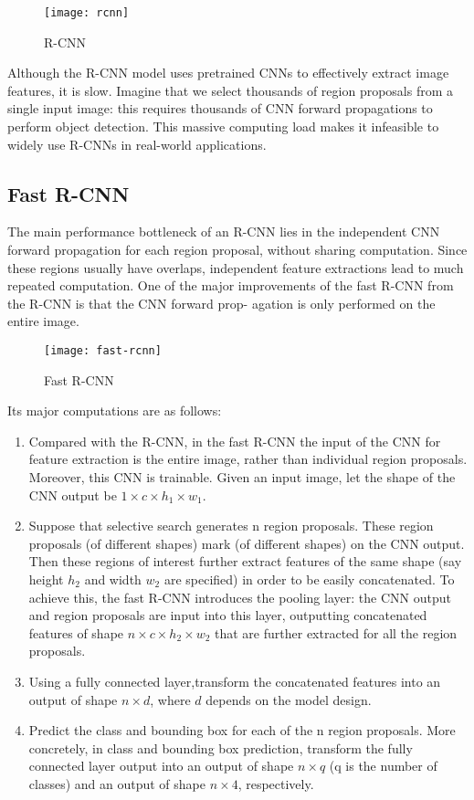 \begin{figure}[H]
  \centering
  \texttt{[image: rcnn]}
  \caption{R-CNN}
  \label{fig:r-cnn}
\end{figure}

Although the R-CNN model uses pretrained CNNs to effectively extract image features, it is slow.
Imagine that we select thousands of region proposals from a single input image: this requires thousands of CNN forward propagations to perform object detection.
This massive computing load makes it infeasible to widely use R-CNNs in real-world applications.


\subsection{Fast R-CNN}
\label{sec:fast-r-cnn}

The main performance bottleneck of an R-CNN lies in the independent CNN forward propagation for each region proposal, without sharing computation.
Since these regions usually have overlaps, independent feature extractions lead to much repeated computation.
One of the major improvements of the fast R-CNN from the R-CNN is that the CNN forward prop- agation is only performed on the entire image.

\begin{figure}[H]
  \centering
  \texttt{[image: fast-rcnn]}
  \caption{Fast R-CNN}
  \label{fig:fast-rcnn}
\end{figure}

Its major computations are as follows:
\begin{enumerate}
\item Compared with the R-CNN, in the fast R-CNN the input of the CNN for feature extraction is the entire image, rather than individual region proposals.
  Moreover, this CNN is trainable.
  Given an input image, let the shape of the CNN output be \(1 \times c \times h_{1} \times w_{1}\).
\item Suppose that selective search generates n region proposals.
  These region proposals (of different shapes) mark  (of different shapes) on the CNN output.
  Then these regions of interest further extract features of the same shape (say height \(h_{2}\) and width \(w_{2}\) are specified) in order to be easily concatenated.
  To achieve this, the fast R-CNN introduces the  pooling layer: the CNN output and region proposals are input into this layer, outputting concatenated features of shape \(n \times c \times h_{2} \times w_{2}\) that are further extracted for all the region proposals.
\item Using a fully connected layer,transform the concatenated features into an output of shape \(n \times d\), where \(d\) depends on the model design.
\item Predict the class and bounding box for each of the n region proposals.
  More concretely, in class and bounding box prediction, transform the fully connected layer output into an output of shape \(n \times q\) (q is the number of classes) and an output of shape \(n \times 4\), respectively.
\end{enumerate}

